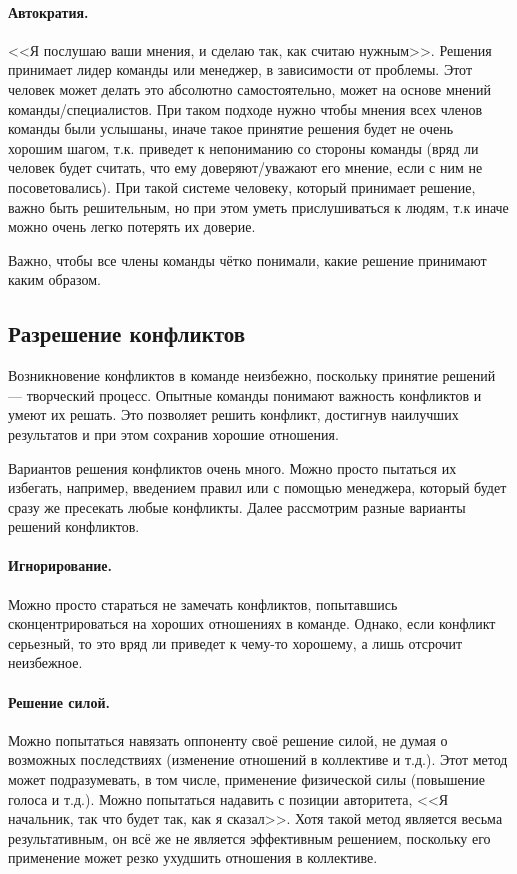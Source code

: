 \documentclass{../../text-style}
\begin{document}
\paragraph*{Автократия.} <<Я послушаю ваши мнения, и сделаю так, как считаю нужным>>. Решения принимает лидер команды или менеджер, в зависимости от проблемы. Этот человек может делать это абсолютно самостоятельно, может на основе мнений команды/специалистов. При таком подходе нужно чтобы мнения всех членов команды были услышаны, иначе такое принятие решения будет не очень хорошим шагом, т.к. приведет к непониманию со стороны команды (вряд ли человек будет считать, что ему доверяют/уважают его мнение, если с ним не посоветовались). При такой системе человеку, который принимает решение, важно быть решительным, но при этом уметь прислушиваться к людям, т.к иначе можно очень легко потерять их доверие.

Важно, чтобы все члены команды чётко понимали, какие решение принимают каким образом.

\subsection{Разрешение конфликтов}

Возникновение конфликтов в команде неизбежно, поскольку принятие решений --- творческий процесс. Опытные команды понимают важность конфликтов и умеют их решать. Это позволяет решить конфликт, достигнув наилучших результатов и при этом сохранив хорошие отношения.

Вариантов решения конфликтов очень много. Можно просто пытаться их избегать, например, введением правил или с помощью менеджера, который будет сразу же пресекать любые конфликты. Далее рассмотрим разные варианты решений конфликтов.

\paragraph*{Игнорирование.} Можно просто стараться не замечать конфликтов, попытавшись сконцентрироваться на хороших отношениях в команде. Однако, если конфликт серьезный, то это вряд ли приведет к чему-то хорошему, а лишь отсрочит неизбежное.

\paragraph*{Решение силой.} Можно попытаться навязать оппоненту своё решение силой, не думая о возможных последствиях (изменение отношений в коллективе и т.д.). Этот метод может подразумевать, в том числе, применение физической силы (повышение голоса и т.д.). Можно попытаться надавить с позиции авторитета, <<Я начальник, так что будет так, как я сказал>>. Хотя такой метод является весьма результативным, он всё же не является эффективным решением, поскольку его применение может резко ухудшить отношения в коллективе.
\end{document}
